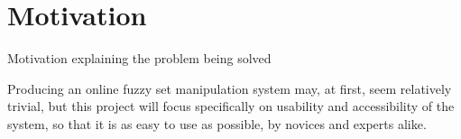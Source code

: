 \section{Motivation}
{\color{red} Motivation explaining the problem being solved}

{\color{red}
Producing an online fuzzy set manipulation system may, at first, seem relatively trivial, but this project will focus specifically on usability and accessibility of the system, so that it is as easy to use as possible, by novices and experts alike. }